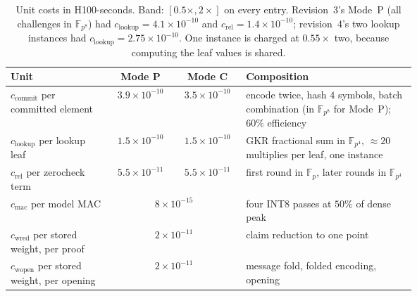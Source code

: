 \documentclass[11pt]{article}
\newcommand{\F}{\mathbb{F}}
\newcommand{\Fp}{\F_p}
\newcommand{\Fq}{\F_{p^4}}
\newcommand{\Fo}{\F_{p^8}}
\begin{document}
\begin{table}[h]
\centering\small
\begin{tabular}{@{}p{0.25\linewidth}ccp{0.42\linewidth}@{}}
\toprule
Unit & Mode P & Mode C & Composition \\
\midrule
\(c_{\mathrm{commit}}\) per committed element & \(3.9\times 10^{-10}\) & \(3.5\times 10^{-10}\) & encode twice, hash \(4\) symbols, batch combination (in \(\Fo\) for Mode~P); \(60\%\) efficiency \\
\(c_{\mathrm{lookup}}\) per lookup leaf & \(1.5\times 10^{-10}\) & \(1.5\times 10^{-10}\) & GKR fractional sum in \(\Fq\), \(\approx 20\) multiplies per leaf, one instance \\
\(c_{\mathrm{rel}}\) per zerocheck term & \(5.5\times 10^{-11}\) & \(5.5\times 10^{-11}\) & first round in \(\Fp\), later rounds in \(\Fq\) \\
\(c_{\mathrm{mac}}\) per model MAC & \multicolumn{2}{c}{\(8\times 10^{-15}\)} & four INT8 passes at \(50\%\) of dense peak \\
\(c_{\mathrm{wred}}\) per stored weight, per proof & \multicolumn{2}{c}{\(2\times 10^{-11}\)} & claim reduction to one point \\
\(c_{\mathrm{wopen}}\) per stored weight, per opening & \multicolumn{2}{c}{\(2\times 10^{-11}\)} & message fold, folded encoding, opening \\
\bottomrule
\end{tabular}
\caption{Unit costs in H100-seconds. Band: \([0.5\times, 2\times]\) on every entry. Revision~3's Mode~P (all challenges in \(\Fo\)) had \(c_{\mathrm{lookup}} = 4.1\times 10^{-10}\) and \(c_{\mathrm{rel}} = 1.4\times 10^{-10}\); revision~4's two lookup instances had \(c_{\mathrm{lookup}} = 2.75\times 10^{-10}\). One instance is charged at \(0.55\times\) two, because computing the leaf values is shared.}
\label{tab:units}
\end{table}
\end{document}
